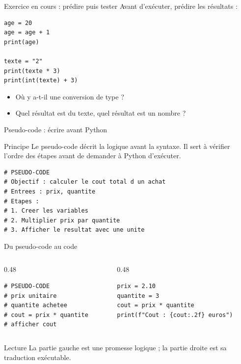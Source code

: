 \documentclass[10pt,aspectratio=169]{beamer}
\begin{document}
\begin{frame}[fragile]{Exercice en cours : prédire puis tester}
Avant d'exécuter, prédire les résultats :
\begin{lstlisting}
age = 20
age = age + 1
print(age)

texte = "2"
print(texte * 3)
print(int(texte) + 3)
\end{lstlisting}
\begin{itemize}
  \item Où y a-t-il une conversion de type ?
  \item Quel résultat est du texte, quel résultat est un nombre ?
\end{itemize}
\end{frame}

\begin{frame}[fragile]{Pseudo-code : écrire avant Python}
\begin{block}{Principe}
Le pseudo-code décrit la logique avant la syntaxe. Il sert à vérifier l’ordre des étapes avant de demander à Python d’exécuter.
\end{block}
\begin{lstlisting}
# PSEUDO-CODE
# Objectif : calculer le cout total d un achat
# Entrees : prix, quantite
# Etapes :
# 1. Creer les variables
# 2. Multiplier prix par quantite
# 3. Afficher le resultat avec une unite
\end{lstlisting}
\end{frame}

\begin{frame}[fragile]{Du pseudo-code au code}
\begin{columns}[T,totalwidth=\textwidth]
\begin{column}{0.48\textwidth}
\begin{lstlisting}
# PSEUDO-CODE
# prix unitaire
# quantite achetee
# cout = prix * quantite
# afficher cout
\end{lstlisting}
\end{column}
\begin{column}{0.48\textwidth}
\begin{lstlisting}
prix = 2.10
quantite = 3
cout = prix * quantite
print(f"Cout : {cout:.2f} euros")
\end{lstlisting}
\end{column}
\end{columns}
\vspace{0.3cm}
\begin{block}{Lecture}
La partie gauche est une promesse logique ; la partie droite est sa traduction exécutable.
\end{block}
\end{frame}
\end{document}
